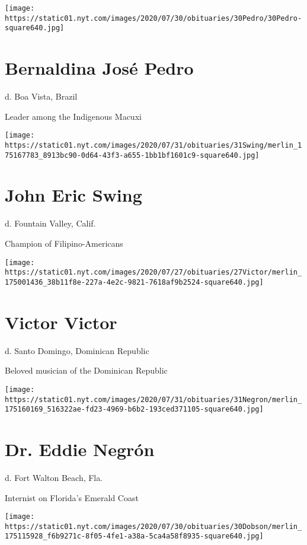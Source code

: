 \texttt{[image: https://static01.nyt.com/images/2020/07/30/obituaries/30Pedro/30Pedro-square640.jpg]}

\hypertarget{bernaldina-josuxe9-pedro}{%
\section{Bernaldina José Pedro}\label{bernaldina-josuxe9-pedro}}

d. Boa Vista, Brazil

Leader among the Indigenous Macuxi

\texttt{[image: https://static01.nyt.com/images/2020/07/31/obituaries/31Swing/merlin\_175167783\_8913bc90-0d64-43f3-a655-1bb1bf1601c9-square640.jpg]}

\hypertarget{john-eric-swing}{%
\section{John Eric Swing}\label{john-eric-swing}}

d. Fountain Valley, Calif.

Champion of Filipino-Americans

\texttt{[image: https://static01.nyt.com/images/2020/07/27/obituaries/27Victor/merlin\_175001436\_38b11f8e-227a-4e2c-9821-7618af9b2524-square640.jpg]}

\hypertarget{victor-victor}{%
\section{Victor Victor}\label{victor-victor}}

d. Santo Domingo, Dominican Republic

Beloved musician of the Dominican Republic

\texttt{[image: https://static01.nyt.com/images/2020/07/31/obituaries/31Negron/merlin\_175160169\_516322ae-fd23-4969-b6b2-193ced371105-square640.jpg]}

\hypertarget{dr-eddie-negruxf3n}{%
\section{Dr. Eddie Negrón}\label{dr-eddie-negruxf3n}}

d. Fort Walton Beach, Fla.

Internist on Florida's Emerald Coast

\texttt{[image: https://static01.nyt.com/images/2020/07/30/obituaries/30Dobson/merlin\_175115928\_f6b9271c-8f05-4fe1-a38a-5ca4a58f8935-square640.jpg]}

